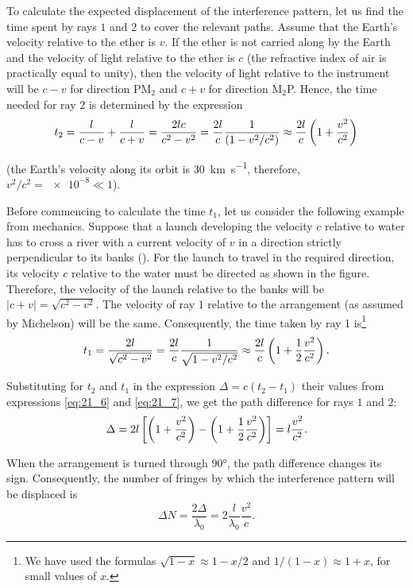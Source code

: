 To calculate the expected displacement of the interference pattern, let us find the time spent by rays $1$ and $2$ to cover the relevant paths.
Assume that the Earth's velocity relative to the ether is $v$.
If the ether is not carried along by the Earth and the velocity of light relative to the ether is $c$ (the refractive index of air is practically equal to unity), then the velocity of light relative to the instrument will be $c - v$ for direction PM$_2$ and $c + v$ for direction M$_2$P.
Hence, the time needed for ray $2$ is determined by the expression
\begin{equation}\label{eq:21_6}
	t_2 = \frac{l}{c-v} + \frac{l}{c+v} = \frac{2lc}{c^2-v^2} = \frac{2l}{c} \frac{1}{(1-v^2/c^2)} \approx \frac{2l}{c} \left(1 + \frac{v^2}{c^2}\right)
\end{equation}

\noindent
(the Earth's velocity along its orbit is \SI{30}{km.s^{-1}}, therefore, $v^2/c^2= \num{e-8}\ll 1$).

Before commencing to calculate the time $t_1$, let us consider the following example from mechanics.
Suppose that a launch developing the velocity $c$ relative to water has to cross a river with a current velocity of $v$ in a direction strictly perpendicular to its banks ().
For the launch to travel in the required direction, its velocity $c$ relative to the water must be directed as shown in the figure.
Therefore, the velocity of the launch relative to the banks will be $|c+v|=\sqrt{c^2-v^2}$.
The velocity of ray $1$ relative to the arrangement (as assumed by Michelson) will be the same.
Consequently, the time taken by ray 1 is\footnote{We have used the formulas $\sqrt{1- x}\approx 1-x/2$ and $1/(1-x) \approx 1+x$, for small values of $x$.}
\begin{equation}\label{eq:21_7}
	t_1 = \frac{2l}{\sqrt{c^2-v^2}} = \frac{2l}{c} \frac{1}{\sqrt{1-v^2/c^2}} \approx \frac{2l}{c} \left(1 + \frac{1}{2} \frac{v^2}{c^2}\right).
\end{equation}

Substituting for $t_2$ and $t_1$ in the expression $\Delta=c(t_2 - t_1)$ their values from expressions \eqref{eq:21_6} and \eqref{eq:21_7}, we get the path difference for rays $1$ and $2$:
\begin{equation*}
	\Delta = 2l \left[\left(1+\frac{v^2}{c^2}\right) - \left(1 + \frac{1}{2} \frac{v^2}{c^2}\right)\right] = l \frac{v^2}{c^2}.
\end{equation*}

\noindent
When the arrangement is turned through \ang{90}, the path difference changes its sign.
Consequently, the number of fringes by which the interference pattern will be displaced is
\begin{equation}\label{eq:21_8}
	\Delta{N} = \frac{2\Delta}{\lambda_0} = 2 \frac{l}{\lambda_0} \frac{v^2}{c}.
\end{equation}

